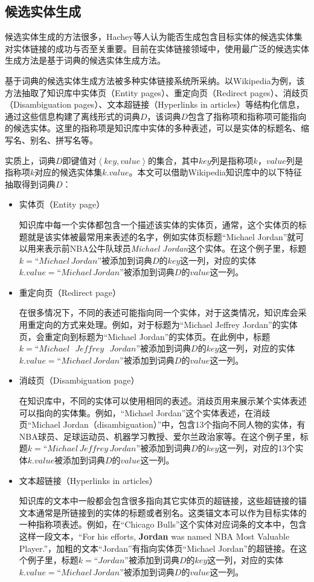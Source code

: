 \subsection{候选实体生成}\label{section:candidate_generate}
候选实体生成的方法很多，Hachey等人\cite{EELWW}认为能否生成包含目标实体的候选实体集对实体链接的成功与否至关重要。目前在实体链接领域中，使用最广泛的候选实体生成方法是基于词典的候选实体生成方法。

基于词典的候选实体生成方法被多种实体链接系统\cite{CELWTGBM,ELFEEKB}所采纳。以Wikipedia为例，该方法抽取了知识库中实体页（Entity pages）、重定向页（Redirect pages）、消歧页（Disambiguation pages）、文本超链接（Hyperlinks in articles）等结构化信息，通过这些信息构建了离线形式的词典$D$，该词典$D$包含了指称项和指称项可能指向的候选实体。这里的指称项是知识库中实体的多种表述，可以是实体的标题名、缩写名、别名、拼写名等。

实质上，词典$D$即键值对$\left\langle key,value\right\rangle $的集合，其中$key$列是指称项$k$，$value$列是指称项$k$对应的候选实体集$k.value$。本文可以借助Wikipedia知识库中的以下特征抽取得到词典$D$：

\begin{itemize}
	\item {实体页（Entity page）
		
		知识库中每一个实体都包含一个描述该实体的实体页，通常，这个实体页的标题就是该实体被最常用来表述的名字，例如实体页标题“Michael Jordan”就可以用来表示前NBA公牛队球员\textit{Michael Jordan}这个实体。在这个例子里，标题$k=“Michael\, Jordan”$被添加到词典$D$的$key$这一列，对应的实体$k.value=“Michael\, Jordan”$被添加到词典$D$的$value$这一列。
		}
	\item {重定向页（Redirect page）
		
		在很多情况下，不同的表述可能指向同一个实体，对于这类情况，知识库会采用重定向的方式来处理。例如，对于标题为“Michael Jeffrey Jordan”的实体页，会重定向到标题为“Michael Jordan”的实体页。在此例中，标题$k=“Michael\text{\ }Jeffrey\text{\ }Jordan”$被添加到词典$D$的$key$这一列，对应的实体$k.value=“Michael\, Jordan”$被添加到词典$D$的$value$这一列。
	}
	\item {消歧页（Disambiguation page）
		
		在知识库中，不同的实体可以使用相同的表述。消歧页用来展示某个实体表述可以指向的实体集。例如，“Michael Jordan”这个实体表述，在消歧页“Michael Jordan（disambiguation）”中，包含13个指向不同人物的实体，有NBA球员、足球运动员、机器学习教授、爱尔兰政治家等。在这个例子里，标题$k=“Michael\, Jeffrey\, Jordan”$被添加到词典$D$的$key$这一列，对应的13个实体$k.value$被添加到词典$D$的$value$这一列。
	}
	\item {文本超链接（Hyperlinks in articles）
		
		知识库的文本中一般都会包含很多指向其它实体页的超链接，这些超链接的锚文本通常是所链接到的实体的标题或者别名。这类锚文本可以作为目标实体的一种指称项表述。例如，在“Chicago Bulls”这个实体对应词条的文本中，包含这样一段文本，“For his efforts, \textbf{Jordan} was named NBA Most Valuable Player.”，加粗的文本“Jordan”有指向实体页“Michael Jordan”的超链接。在这个例子里，标题$k=“Jordan”$被添加到词典$D$的$key$这一列，对应的实体$k.value=“Michael\, Jordan”$被添加到词典$D$的$value$这一列。
	}
\end{itemize}

